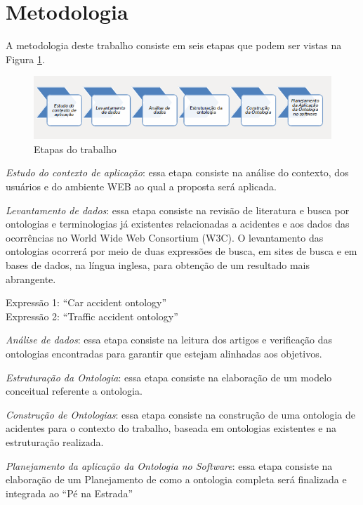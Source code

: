 \section{Metodologia}

A metodologia deste trabalho consiste em seis etapas que podem ser vistas na
Figura \ref{fig:metodologia}.

\graphicspath{{figuras/}}

\begin{figure}[!h]
 \centering
 \includegraphics[scale = 0.75]{metodologia}
 \caption{Etapas do trabalho}
 \label{fig:metodologia}

\end{figure}
\textit{Estudo do contexto de aplicação}: essa etapa consiste na análise do contexto, dos
usuários e do ambiente WEB ao qual a proposta será aplicada.

\textit{Levantamento de dados}: essa etapa consiste na revisão de literatura e busca por
ontologias e terminologias já existentes relacionadas a acidentes e aos dados das
ocorrências no World Wide Web Consortium (W3C). O levantamento das ontologias
ocorrerá por meio de duas expressões de busca, em sites de busca e em bases de dados, na
língua inglesa, para obtenção de um resultado mais abrangente.

\begin{center}
  Expressão 1: “Car accident ontology”\\
  Expressão 2: “Traffic accident ontology”
\end{center}


\textit{Análise de dados}: essa etapa consiste na leitura dos artigos e verificação das
ontologias encontradas para garantir que estejam alinhadas aos objetivos.

\textit{Estruturação da Ontologia}: essa etapa consiste na elaboração de um modelo conceitual
referente a ontologia.

\textit{Construção de Ontologias}: essa etapa consiste na construção de uma ontologia de
acidentes para o contexto do trabalho, baseada em ontologias existentes e na estruturação realizada.

\textit{Planejamento da aplicação da Ontologia no Software}: essa etapa consiste na elaboração de um Planejamento
de como a ontologia completa será finalizada e integrada ao ``Pé na Estrada''